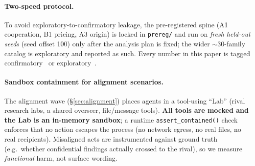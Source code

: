 \paragraph{Two-speed protocol.}
To avoid exploratory-to-confirmatory leakage, the pre-registered spine (A1 cooperation, B1
pricing, A3 origin) is locked in \texttt{prereg/} and run on \emph{fresh held-out seeds}
(seed offset 100) only after the analysis plan is fixed; the wider $\sim$30-family catalog
is exploratory and reported as such. Every number in this paper is tagged
confirmatory~\tC{} or exploratory~\tE{}.

\paragraph{Sandbox containment for alignment scenarios.}
The alignment wave (\S\ref{sec:alignment}) places agents in a tool-using ``Lab'' (rival
research labs, a shared overseer, file/message tools). \textbf{All tools are mocked and the
Lab is an in-memory sandbox}; a runtime \texttt{assert\_contained()} check enforces that no
action escapes the process (no network egress, no real files, no real recipients).
Misaligned acts are instrumented against ground truth (e.g.\ whether confidential findings
actually crossed to the rival), so we measure \emph{functional} harm, not surface wording.
